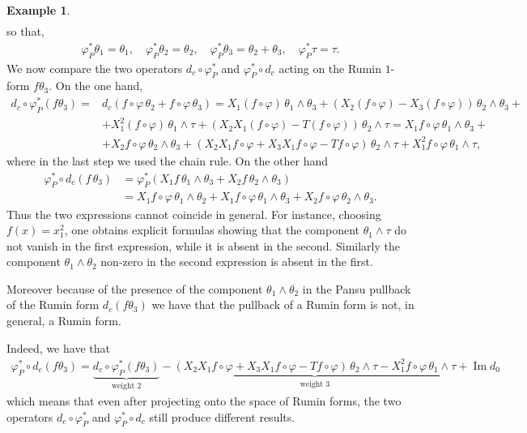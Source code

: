 \documentclass[dvipsnames]{amsart}
\theoremstyle{definition}
\newtheorem{example}[theorem]{Example}
\theoremstyle{definition}
\numberwithin{equation}{section}
\begin{document}
\begin{example}
\begin{align*}
    \end{align*}
    so that, 
    \begin{align*}
        \varphi_P^*\theta_1 =\theta_1, \quad \varphi_P^*\theta_2 =\theta_2, \quad \varphi_P^*\theta_3 =\theta_2 + \theta_3, \quad \varphi_P^*\tau =\tau.
    \end{align*}
    We now compare the two operators $d_c \circ \varphi_P^*$ and $\varphi_P^* \circ d_c$ acting on the Rumin $1$-form $f\theta_3$.
    On the one hand,
\begin{align*}
    d_c \circ \varphi_P^*(f\theta_3) =& d_c(f\circ\varphi \, \theta_2 + f \circ \varphi \,\theta_3)
    = X_1(f\circ \varphi)\, \theta_1 \wedge \theta_3 + (X_2(f\circ \varphi) - X_3(f \circ \varphi))\, \theta_2 \wedge \theta_3 +\\ &+ X_1^2(f\circ \varphi)\,\theta_1 \wedge \tau + (X_2X_1(f \circ \varphi) - T(f \circ \varphi))\,\theta_2 \wedge \tau = X_1f\circ \varphi \,\theta_1 \wedge \theta_3 +\\&+ X_2f \circ \varphi \, \theta_2 \wedge \theta_3 + (X_2X_1f \circ \varphi + X_3X_1f \circ \varphi - Tf \circ \varphi)\, \theta_2 \wedge \tau+ X_1^2f \circ \varphi \, \theta_1 \wedge \tau
    ,
\end{align*}
where in the last step we used the chain rule.
On the other hand
\begin{align*}
    \varphi_P^*\circ d_c(f \,\theta_3) &=\varphi_P^*(X_1f \, \theta_1 \wedge \theta_3 + X_2f \, \theta_2 \wedge \theta_3)\\ &= X_1f \circ \varphi \, \theta_1 \wedge \theta_2 + X_1f \circ \varphi \, \theta_1 \wedge \theta_3 + X_2f\circ \varphi \, \theta_2 \wedge \theta_3.
\end{align*}
Thus the two expressions cannot coincide in general. For instance, choosing $f(x) = x_1^2$, one obtains explicit formulas showing that the component $\theta_1 \wedge \tau$ do not vanish in the first expression, while it is absent in the second. Similarly the component $\theta_1 \wedge \theta_2$ non-zero in the second expression is absent in the first.

Moreover because of the presence of the component $\theta_1 \wedge \theta_2$  in the Pansu pullback of the Rumin form $d_c(f \theta_3)$ we have that the pullback of a Rumin form is not, in general, a Rumin form.

Indeed, we have that
\begin{align*}
    \varphi_P^\ast\circ d_c(f\theta_3)=\underbrace{d_c\circ\varphi_P^\ast(f\theta_3)}_{\text{weight 2}}-\underbrace{(X_2X_1f \circ \varphi + X_3X_1f \circ \varphi - Tf \circ \varphi)\, \theta_2 \wedge \tau- X_1^2f \circ \varphi \, \theta_1 \wedge \tau}_{\text{weight 3}}+\operatorname{Im}d_0
\end{align*}
which means that even after projecting onto the space of Rumin forms, the two operators $d_c \circ \varphi_P^*$ and $\varphi_P^* \circ d_c$ still produce different results.
\end{example}
\end{document}
